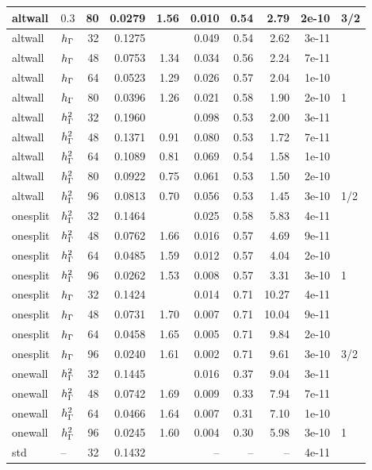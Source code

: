 \begin{table}[ht]
\begin{tabular}{llrrrrrrrl}
altwall & $0.3$ & 80 & 0.0279 & 1.56 & 0.010 & 0.54 & 2.79 & 2e-10 & 3/2\\
\midrule
altwall & $h_\Gamma$ & 32 & 0.1275 &  & 0.049 & 0.54 & 2.62 & 3e-11 & \\
altwall & $h_\Gamma$ & 48 & 0.0753 & 1.34 & 0.034 & 0.56 & 2.24 & 7e-11 & \\
altwall & $h_\Gamma$ & 64 & 0.0523 & 1.29 & 0.026 & 0.57 & 2.04 & 1e-10 & \\
altwall & $h_\Gamma$ & 80 & 0.0396 & 1.26 & 0.021 & 0.58 & 1.90 & 2e-10 & 1\\
\midrule
altwall & $h_\Gamma^2$ & 32 & 0.1960 &  & 0.098 & 0.53 & 2.00 & 3e-11 & \\
altwall & $h_\Gamma^2$ & 48 & 0.1371 & 0.91 & 0.080 & 0.53 & 1.72 & 7e-11 & \\
altwall & $h_\Gamma^2$ & 64 & 0.1089 & 0.81 & 0.069 & 0.54 & 1.58 & 1e-10 & \\
altwall & $h_\Gamma^2$ & 80 & 0.0922 & 0.75 & 0.061 & 0.53 & 1.50 & 2e-10 & \\
altwall & $h_\Gamma^2$ & 96 & 0.0813 & 0.70 & 0.056 & 0.53 & 1.45 & 3e-10 & 1/2\\
\midrule
onesplit & $h_\Gamma^2$ & 32 & 0.1464 &  & 0.025 & 0.58 & 5.83 & 4e-11 & \\
onesplit & $h_\Gamma^2$ & 48 & 0.0762 & 1.66 & 0.016 & 0.57 & 4.69 & 9e-11 & \\
onesplit & $h_\Gamma^2$ & 64 & 0.0485 & 1.59 & 0.012 & 0.57 & 4.04 & 2e-10 & \\
onesplit & $h_\Gamma^2$ & 96 & 0.0262 & 1.53 & 0.008 & 0.57 & 3.31 & 3e-10 & 1\\
\midrule
onesplit & $h_\Gamma$ & 32 & 0.1424 &  & 0.014 & 0.71 & 10.27 & 4e-11 & \\
onesplit & $h_\Gamma$ & 48 & 0.0731 & 1.70 & 0.007 & 0.71 & 10.04 & 9e-11 & \\
onesplit & $h_\Gamma$ & 64 & 0.0458 & 1.65 & 0.005 & 0.71 & 9.84 & 2e-10 & \\
onesplit & $h_\Gamma$ & 96 & 0.0240 & 1.61 & 0.002 & 0.71 & 9.61 & 3e-10 & 3/2\\
\midrule
onewall & $h_\Gamma^2$ & 32 & 0.1445 &  & 0.016 & 0.37 & 9.04 & 3e-11 & \\
onewall & $h_\Gamma^2$ & 48 & 0.0742 & 1.69 & 0.009 & 0.33 & 7.94 & 7e-11 & \\
onewall & $h_\Gamma^2$ & 64 & 0.0466 & 1.64 & 0.007 & 0.31 & 7.10 & 1e-10 & \\
onewall & $h_\Gamma^2$ & 96 & 0.0245 & 1.60 & 0.004 & 0.30 & 5.98 & 3e-10 & 1\\
\midrule
std & -- & 32 & 0.1432 &  & -- & -- & -- & 4e-11 & \\

\end{tabular}
\end{table}
